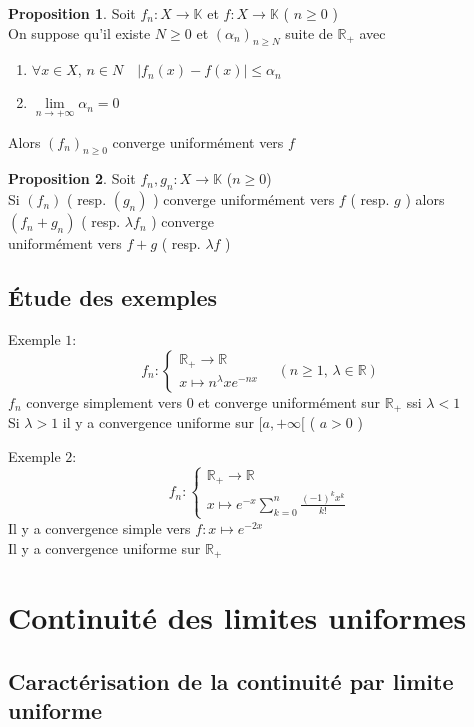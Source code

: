 \documentclass[10pt,a4paper]{article}
\theoremstyle{definition}
\newtheorem{proposition}{Proposition}[section]
\begin{document}
\begin{proposition}
Soit $f_n: X \to \mathbb{K}$ et $f:X \to \mathbb{K}$ ( $n \geq 0$ ) \\
On suppose qu'il existe $N \geq 0$ et $(\alpha_n)_{n \geq N}$ suite de $\mathbb{R}_+$ avec
\begin{enumerate}
\item $\forall x \in X,\, n \in N \quad|f_n(x) - f(x)| \leq \alpha_n$
\item $\lim\limits_{n \to +\infty} \alpha_n = 0$
\end{enumerate}
Alors $(f_n)_{n \geq 0}$ converge uniformément vers $f$
\end{proposition}
\begin{proposition}
Soit $f_n, g_n: X \to \mathbb{K}$ ($n \geq 0$) \\
Si $(f_n)$ ( resp. $(g_n)$ ) converge uniformément vers $f$ ( resp. $g$ ) alors $(f_n + g_n)$ ( resp. $\lambda f_n$ ) converge  \\
uniformément vers $f + g$ ( resp. $\lambda f$ )
\end{proposition}

\subsection{Étude des exemples}
\noindent Exemple $1$: \[f_n: \begin{cases}
\mathbb{R}_+ \to \mathbb{R} \\
x \mapsto n^\lambda x e^{-n x}
\end{cases} \quad ( n \geq 1 ,\, \lambda \in \mathbb{R} ) \]
$f_n$ converge simplement vers $0$ et converge uniformément sur $\mathbb{R}_+$ ssi $\lambda < 1$ \\
Si $\lambda > 1$ il y a convergence uniforme sur $[a, +\infty[$ ( $a > 0$ ) \medskip 

\noindent Exemple $2$: \[f_n: \begin{cases}
\mathbb{R}_+ \to \mathbb{R} \\
x \mapsto e^{-x} \sum\limits_{k = 0}^n \frac{(-1)^k x^k}{k!}
\end{cases}\]
Il y a convergence simple vers $f: x \mapsto e^{-2x}$ \\
Il y a convergence uniforme sur $\mathbb{R}_+$

\section{Continuité des limites uniformes}
\subsection{Caractérisation de la continuité par limite uniforme}
\end{document}
